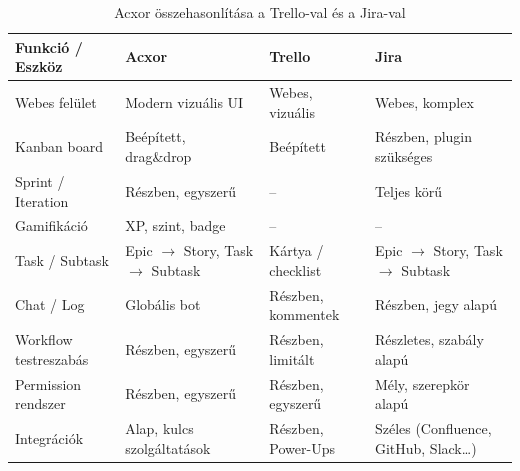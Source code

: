 \begin{table}[h!]
\centering
\caption{Acxor összehasonlítása a Trello-val és a Jira-val \cite{trello, jira}}
\label{tab:comparison1}
\scriptsize
\setlength{\arrayrulewidth}{0.5pt}
\begin{tabularx}{\textwidth}{|l|>{\raggedright\arraybackslash}X|>{\raggedright\arraybackslash}X|>{\raggedright\arraybackslash}p{3.0cm}|}
\hline
\textbf{Funkció / Eszköz} & \textbf{Acxor} & \textbf{Trello} & \textbf{Jira} \\
\hline
Webes felület & Modern vizuális UI & Webes, vizuális & Webes, komplex \\
Kanban board & Beépített, drag\&drop & Beépített & Részben, plugin szükséges \\
Sprint / Iteration & Részben, egyszerű & -- & Teljes körű \\
Gamifikáció & XP, szint, badge & -- & -- \\
Task / Subtask & Epic $\rightarrow$ Story, Task $\rightarrow$ Subtask & Kártya / checklist & Epic $\rightarrow$ Story, Task $\rightarrow$ Subtask \\
Chat / Log & Globális bot & Részben, kommentek & Részben, jegy alapú \\
Workflow testreszabás & Részben, egyszerű & Részben, limitált & Részletes, szabály alapú \\
Permission rendszer & Részben, egyszerű & Részben, egyszerű & Mély, szerepkör alapú \\
Integrációk & Alap, kulcs szolgáltatások & Részben, Power-Ups & Széles (Confluence, GitHub, Slack\ldots) \\
\hline
\end{tabularx}
\end{table}


